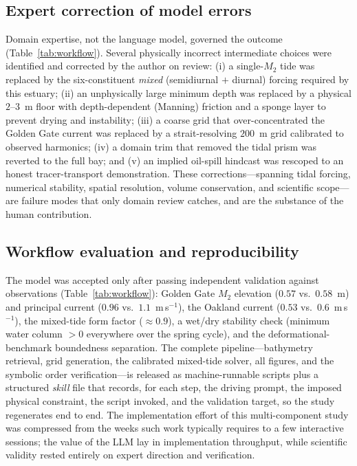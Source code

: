 \documentclass[Journal]{ascelike}   %
\begin{document}
\subsection{Expert correction of model errors}
Domain expertise, not the language model, governed the outcome
(Table~\ref{tab:workflow}). Several physically incorrect intermediate choices were
identified and corrected by the author on review: (i) a single-$M_2$ tide was replaced
by the six-constituent \emph{mixed} (semidiurnal $+$ diurnal) forcing required by this
estuary; (ii) an unphysically large minimum depth was replaced by a physical
$2$--$3$~m floor with depth-dependent (Manning) friction and a sponge layer to prevent
drying and instability; (iii) a coarse grid that over-concentrated the Golden Gate
current was replaced by a strait-resolving $200$~m grid calibrated to observed
harmonics; (iv) a domain trim that removed the tidal prism was reverted to the full
bay; and (v) an implied oil-spill hindcast was rescoped to an honest
tracer-transport demonstration. These corrections---spanning tidal forcing, numerical
stability, spatial resolution, volume conservation, and scientific scope---are failure
modes that only domain review catches, and are the substance of the human
contribution.

\subsection{Workflow evaluation and reproducibility}
The model was accepted only after passing independent validation against observations
(Table~\ref{tab:workflow}): Golden Gate $M_2$ elevation ($0.57$ vs.\ $0.58$~m) and
principal current ($0.96$ vs.\ $1.1$~m\,s$^{-1}$), the Oakland current ($0.53$ vs.\
$0.6$~m\,s$^{-1}$), the mixed-tide form factor ($\approx0.9$), a wet/dry stability
check (minimum water column $>0$ everywhere over the spring cycle), and the
deformational-benchmark boundedness separation. The complete pipeline---bathymetry
retrieval, grid generation, the calibrated mixed-tide solver, all figures, and the
symbolic order verification---is released as machine-runnable scripts plus a
structured \emph{skill} file that records, for each step, the driving prompt, the
imposed physical constraint, the script invoked, and the validation target, so the
study regenerates end to end. The implementation effort of this multi-component study
was compressed from the weeks such work typically requires to a few interactive
sessions; the value of the LLM lay in implementation throughput, while scientific
validity rested entirely on expert direction and verification.
\end{document}
